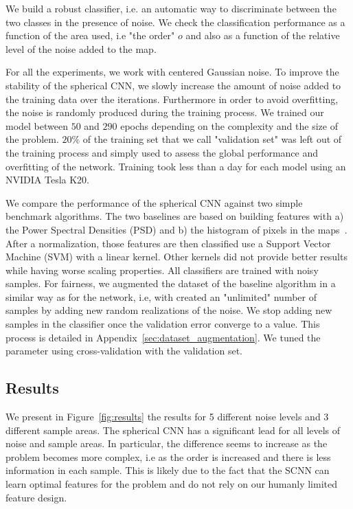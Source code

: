 \documentclass[final,twocolumn,3p,times,authoryear]{elsarticle}
\newcommand{\todo}[1]{{\color[rgb]{.6,.1,.6}{#1}}}
\newcommand{\figref}[1]{Figure~\ref{fig:#1}}
\newcommand{\1}{\b{1}}              %
\newcommand{\0}{\b{0}}              %
\begin{document}
We build a robust classifier, i.e. an automatic way to
discriminate between the two classes in the presence of noise.
We check the classification performance as a function of the area used, i.e "the order" $o$ and also as a function of the relative level of the noise added to the map.

For all the
experiments, we work with centered Gaussian noise. \todo{Tomek: could you put a
justification.} To improve the
stability of the spherical CNN, we slowly increase the amount of noise added to
the training data over the iterations. Furthermore in order to avoid
overfitting, the noise is randomly produced during the training process. We trained our
model between $50$ and $290$ epochs depending on the complexity and the size of
the problem. $20\%$ of the training set that we call "validation set" was left out of the training process and simply used to assess the global performance and overfitting of
the network.
Training took less than a day for each model using an NVIDIA Tesla K20.

We compare the performance of the spherical CNN against two simple benchmark
algorithms. The two baselines are based on building features with a) the Power
Spectral Densities (PSD) and b) the histogram of pixels in the maps~\cite{patton2017cosmologicalconstraints}.
After a normalization, those features are then classified use a Support Vector
Machine (SVM) with a linear kernel. Other kernels did not provide better results
while having worse scaling properties. All classifiers are trained with noisy samples. For fairness, we augmented the dataset
of the baseline algorithm in a similar way as for the network, i.e, with
created an "unlimited" number of samples by adding new random realizations of
the noise. We stop adding new samples in the classifier once the validation
error converge to a value. This process is detailed in Appendix~\ref{sec:dataset_augmentation}. We tuned the parameter using cross-validation with the validation set.

\subsection{Results}

We present in \figref{results} the results for 5 different noise
levels and $3$ different sample areas. The spherical CNN has a significant lead for all levels of noise and sample areas.
In particular, the difference seems to increase as the problem becomes more complex, i.e as the order is increased and there is less information in each sample.
This is likely due to the fact that the SCNN can learn optimal features for the problem and do not rely on our humanly limited feature design.
\end{document}
